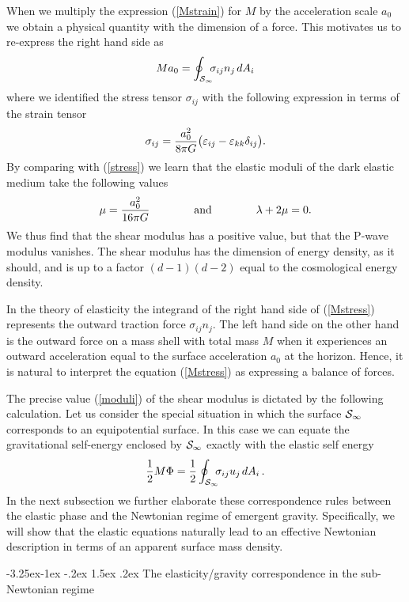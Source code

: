 \documentclass[a4paper,12pt]{article}
\makeatletter
\renewcommand\subsection{\@startsection{subsection}{2}{\z@}%
                                     {-3.25ex\@plus -1ex \@minus -.2ex}%
                                     {1.5ex \@plus .2ex}%
                                     {\normalfont\bfseries}}
\newcommand{\be}{\begin{equation}}
\newcommand{\ee}{\end{equation}}
\makeatother
\begin{document}
When we multiply the expression (\ref{Mstrain}) for    $M$ by the acceleration scale $a_0$ we obtain a physical quantity with the dimension of a force.  This motivates us to re-express the right hand side as 
\be
\label{Mstress}
M a_0 = \oint_{{\cal S}_{\infty}} \!\!\!\sigma_{ij} n_{j\,} dA_i
\ee
where we identified the stress tensor $\sigma_{ij}$ with the following expression in terms of the strain tensor 
\be
\label{sigmadef}
\sigma_{ij}  = {a_0^2\over 8\pi G}\bigl(\varepsilon_{ij}- \varepsilon_{kk}\delta_{ij}\bigr) .
\ee
By comparing with (\ref{stress}) we learn that the  elastic moduli of the dark elastic medium   take the following values
\be
\label{moduli}
\mu =  {a_0^2\over 16\pi G} \qquad \qquad \mbox{and}\qquad \qquad \lambda +2\mu = 0 .
\ee
We thus find that the shear modulus has a positive value, but that the P-wave modulus vanishes. 
The shear modulus has the dimension of energy density, as it should, and is up to a factor $
(d-1)(d-2)$ equal to the cosmological energy density.  

In the theory of elasticity the integrand of the right hand side of (\ref{Mstress}) represents the outward traction force $\sigma_{ij}n_j$. The left hand side on the other hand is the outward force on a mass shell with total mass $M$   when it experiences an outward acceleration equal to the surface acceleration $a_0$ at the horizon.  Hence,  it is natural to interpret the equation (\ref{Mstress}) as expressing a balance of forces. 

The precise value (\ref{moduli}) of the shear modulus is dictated by the following calculation. Let us consider the special situation in which the surface ${\cal S}_\infty$ corresponds to an equipotential surface. In this case we can equate the gravitational self-energy  enclosed by ${\cal S}_\infty$ exactly with the elastic self energy
\begin{equation}
{1\over 2} M\Phi = {1\over 2}	\oint_{{\cal S}_{\infty}} \!\!\!\sigma_{ij} u_{j\,} dA_i  \, .
\end{equation}
 In the next subsection we further elaborate these correspondence rules between the elastic phase  and the Newtonian regime of emergent gravity. Specifically, we will show that the elastic equations naturally lead to an effective Newtonian description in terms of an apparent surface mass density.  






\subsection{The elasticity/gravity correspondence in the sub-Newtonian regime}
\end{document}
